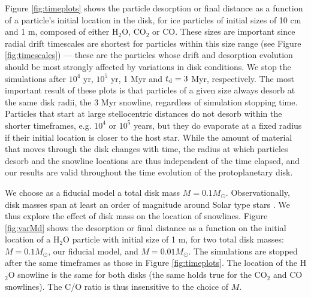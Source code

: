\documentclass[apj]{emulateapj}
\begin{document}
Figure \ref{fig:timeplots} shows the particle desorption or final distance as a function of a particle's initial location in the disk, for ice particles %
of initial sizes of 10 cm and 1 m, composed of either H$_2$O, CO$_2$ or CO. These sizes are important since radial drift timescales are shortest for particles within this size range (see Figure \ref{fig:timescales}) --- these are the particles whose drift and desorption evolution should be most strongly affected by variations in disk conditions. We stop the simulations after $10^4$ yr, $10^5$ yr, 1 Myr and $t_{\rm d}=3$ Myr, respectively. %
The most important result of these plots is that particles of a given size always desorb at the same disk radii, the 3 Myr snowline, regardless of simulation stopping time.  Particles %
that start at large stellocentric distances do not desorb within the shorter timeframes, e.g. $10^4$ or $10^5$ years, but they do evaporate at a fixed radius if their initial location is closer to the host star. While the amount of material that moves through the disk changes with time, the radius at which particles desorb and 
the snowline locations are thus independent of the time elapsed, and %
our results are %
valid throughout the time evolution of the protoplanetary disk. 

We choose as a fiducial model a total disk mass $M=0.1 M_{\odot}$. Observationally, disk masses span at least an order of magnitude around Solar type stars %
\citep{andrews13}. %
We thus explore the effect of disk mass on the location of snowlines. Figure \ref{fig:varMd} shows the desorption or final distance as a function on the initial location of a H$_2$O particle with initial size of 1 m, for two total disk masses: $M=0.1 M_{\odot}$, our fiducial model, and $M=0.01 M_{\odot}$. The simulations are stopped after the same timeframes as those in Figure \ref{fig:timeplots}. The location of the H$_2$O snowline is the same for both disks (the same holds true for the CO$_2$ and CO snowlines). The C/O ratio is thus insensitive to the choice of $M$. %
\end{document}
